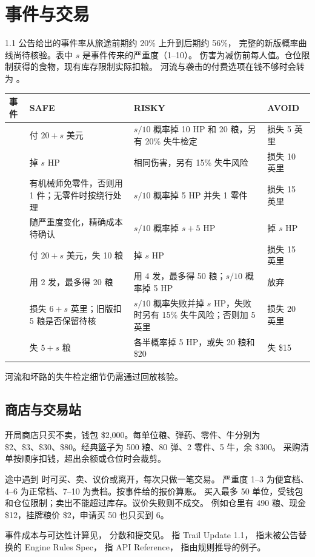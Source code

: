 \documentclass[UTF8,11pt,a4paper]{ctexart}
\begin{document}
\clearpage
\section{事件与交易}

1.1 公告给出的事件率从旅途前期约 20\% 上升到后期约 56\%，
完整的新版概率曲线尚待核验。表中 $s$ 是事件传来的严重度（1--10）。
伤害为减伤前每人值。仓位限制获得的食物，现有库存限制实际扣粮。
河流与袭击的付费选项在钱不够时会转为 。   

\begin{center}\small
\begin{tabularx}{\linewidth}{@{}L{2.55cm}Y Y L{2.25cm}@{}}
\toprule
事件 & SAFE & RISKY & AVOID \\
\midrule
{} & 付 $20+s$ 美元 &
$s/10$ 概率掉 10 HP 和 20 粮，另有 20\% 失牛检定 & 损失 5 英里 \\
 & 掉 $s$ HP & 相同伤害，另有 15\% 失牛风险 & 损失 10 英里 \\
 & 有机械师免零件，否则用 1 件；无零件时按绕行处理 &
$s/10$ 概率掉 5 HP 并失 1 零件 & 损失 15 英里 \\
 & 随严重度变化，精确成本待确认 &
$s/10$ 概率掉 $s+5$ HP & 掉 $s$ HP \\
 & 付 $20+s$ 美元，失 10 粮 & 掉 $s$ HP & 损失 15 英里 \\
 & 用 2 发，最多得 20 粮 & 用 4 发，最多得 50 粮；$s/10$ 概率掉 5 HP & 放弃 \\
 & 损失 $6+s$ 英里；旧版扣 5 粮是否保留待核 &
$s/10$ 概率失败并掉 $s$ HP，失败时另有 15\% 失牛风险；否则加 5 英里 & 损失 20 英里 \\
 & 失 $5+s$ 粮 & 各半概率掉 5 HP，或失 20 粮和 \$20 & 失 \$15 \\
\bottomrule
\end{tabularx}
\end{center}

\noindent 河流和坏路的失牛检定细节仍需通过回放核验。

\subsection{商店与交易站}
开局商店只买不卖，钱包 \$2,000。每单位粮、弹药、零件、牛分别为
\$2、\$3、\$30、\$80。经典篮子为 500 粮、80 弹、2 零件、5 牛，余 \$300。
采购清单按顺序扣钱，超出余额或仓位时会裁剪。 

途中遇到  时可买、卖、议价或离开，每次只做一笔交易。
严重度 1--3 为便宜档、4--6 为正常档、7--10 为贵档。按事件给的报价算账。
买入最多 50 单位，受钱包和仓位限制；卖出不能超过库存。议价失败则不成交。
例如仓里有 490 粮、现金 \$12，挂牌粮价 \$2，申请买 50 也只买到 6。  

\medskip
\noindent 事件成本与可达性计算见，
分数和提交见。
 指 Trail Update 1.1， 指未被公告替换的 Engine Rules Spec，
 指 API Reference， 指由规则推导的例子。
\end{document}
